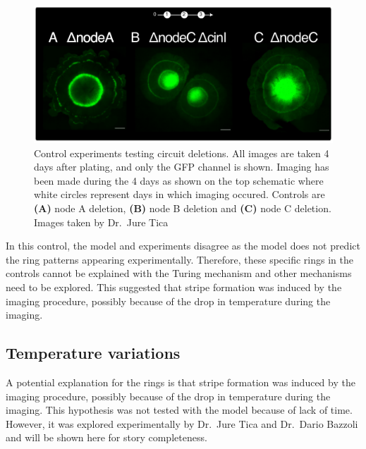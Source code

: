 \begin{figure}[H] %
    \centering
    \begin{adjustbox}{center}
        \includegraphics[width=1\textwidth]{chapters/Chapter 3/experimental_node_dele} %
    \end{adjustbox}
    \caption{Control experiments testing circuit deletions. All images are taken 4 days after plating, and only the GFP channel is shown. Imaging has been made during the 4 days as shown on the top schematic where white circles represent days in which imaging occured. Controls are \textbf{(A)} node A deletion, \textbf{(B)} node B deletion and \textbf{(C)} node C deletion. Images taken by Dr.~Jure Tica}
    \label{fig:experimental_node_dele}
\end{figure}

In this control, the model and experiments disagree as the model does not predict the ring patterns appearing experimentally.
Therefore, these specific rings in the controls cannot be explained with the Turing mechanism and other mechanisms need to be explored.
This suggested that stripe formation was induced by the imaging procedure, possibly because of the drop in temperature during the imaging.
\subsection{Temperature variations}
A potential explanation for the rings is that stripe formation was induced by the imaging procedure, possibly because of the drop in temperature during the imaging.
This hypothesis was not tested with the model because of lack of time.
However, it was explored experimentally by Dr.~Jure Tica and Dr.~Dario Bazzoli and will be shown here for story completeness.

